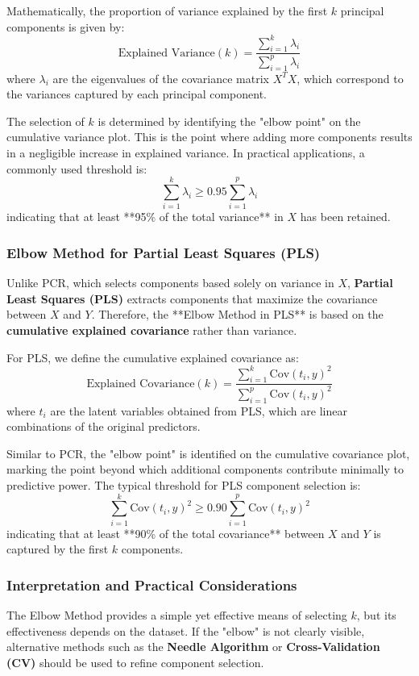 \documentclass[11pt,twoside,a4paper]{article}
\begin{document}
Mathematically, the proportion of variance explained by the first \( k \) principal components is given by:
\[
\text{Explained Variance}(k) = \frac{\sum_{i=1}^{k} \lambda_i}{\sum_{i=1}^{p} \lambda_i}
\]
where \( \lambda_i \) are the eigenvalues of the covariance matrix \( X^T X \), which correspond to the variances captured by each principal component.

The selection of \( k \) is determined by identifying the "elbow point" on the cumulative variance plot. This is the point where adding more components results in a negligible increase in explained variance. In practical applications, a commonly used threshold is:
\[
\sum_{i=1}^{k} \lambda_i \geq 0.95 \sum_{i=1}^{p} \lambda_i
\]
indicating that at least **95\% of the total variance** in \( X \) has been retained.

\subsubsection{Elbow Method for Partial Least Squares (PLS)}
Unlike PCR, which selects components based solely on variance in \( X \), \textbf{Partial Least Squares (PLS)} extracts components that maximize the covariance between \( X \) and \( Y \). Therefore, the **Elbow Method in PLS** is based on the \textbf{cumulative explained covariance} rather than variance.

For PLS, we define the cumulative explained covariance as:
\[
\text{Explained Covariance}(k) = \frac{\sum_{i=1}^{k} \text{Cov}(t_i, y)^2}{\sum_{i=1}^{p} \text{Cov}(t_i, y)^2}
\]
where \( t_i \) are the latent variables obtained from PLS, which are linear combinations of the original predictors.

Similar to PCR, the "elbow point" is identified on the cumulative covariance plot, marking the point beyond which additional components contribute minimally to predictive power. The typical threshold for PLS component selection is:
\[
\sum_{i=1}^{k} \text{Cov}(t_i, y)^2 \geq 0.90 \sum_{i=1}^{p} \text{Cov}(t_i, y)^2
\]
indicating that at least **90\% of the total covariance** between \( X \) and \( Y \) is captured by the first \( k \) components.

\subsubsection{Interpretation and Practical Considerations}
The Elbow Method provides a simple yet effective means of selecting \( k \), but its effectiveness depends on the dataset. If the "elbow" is not clearly visible, alternative methods such as the \textbf{Needle Algorithm} or \textbf{Cross-Validation (CV)} should be used to refine component selection.
\end{document}

